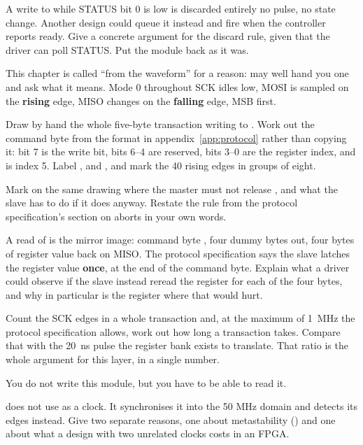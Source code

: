  A write to  while STATUS bit 0 is low is discarded entirely \textemdash{} no
pulse, no state change. Another design could queue it instead and fire when the controller reports
ready. Give a concrete argument for the discard rule, given that the driver can poll STATUS. Put the
module back as it was.

\label{c18:ex:waveform}
This chapter is called ``from the waveform'' for a reason:  may well hand you one and
ask what it means. Mode 0 throughout \textemdash{} SCK idles low, MOSI is sampled on the
\textbf{rising} edge, MISO changes on the \textbf{falling} edge, MSB first.

 Draw by hand the whole five-byte transaction writing  to .
Work out the command byte from the format in appendix~\ref{app:protocol} rather than copying it: bit 7
is the write bit, bits 6--4 are reserved, bits 3--0 are the register index, and  is
index 5. Label ,  and , and mark the 40 rising edges in groups of eight.

 Mark on the same drawing where the master must not release , and what the slave has
to do if it does anyway. Restate the rule from the protocol specification's section on aborts in your
own words.

 A read of  is the mirror image: command byte , four dummy bytes out,
four bytes of register value back on MISO. The protocol specification says the slave latches the
register value \textbf{once}, at the end of the command byte. Explain what a driver could observe if
the slave instead reread the register for each of the four bytes, and why  in particular
is the register where that would hurt.

 Count the SCK edges in a whole transaction and, at the maximum of 1~MHz the protocol
specification allows, work out how long a transaction takes. Compare that with the 20~ns pulse the
register bank exists to translate. That ratio is the whole argument for this layer, in a single
number.

\label{c18:ex:slave}
You do not write this module, but you have to be able to read it.

  does not use  as a clock. It synchronises it into the 50 MHz
domain and detects its edges instead. Give two separate reasons, one about metastability
() and one about what a design with two unrelated clocks costs in an FPGA.

